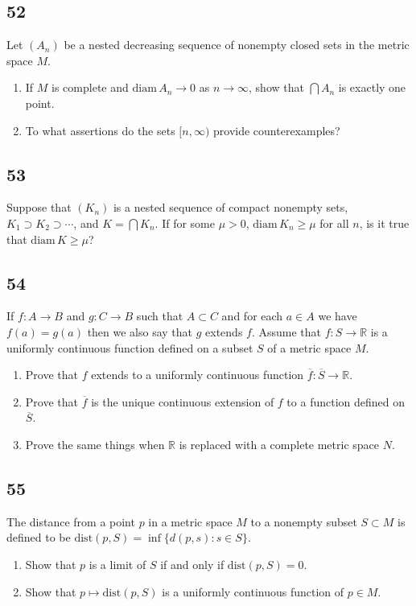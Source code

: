 \documentclass{amsart}
\begin{document}
\subsection*{52}
Let $(A_n)$ be a nested decreasing sequence of nonempty closed sets in the metric space $M$.
\begin{enumerate}[label=(\alph*)]
\item If $M$ is complete and $\mathrm{diam}\, A_n \to 0$ as $n \to \infty$, show that $\bigcap A_n$ is exactly one point.
\item To what assertions do the sets $[n,\infty)$ provide counterexamples?
\end{enumerate}

\subsection*{53}
Suppose that $(K_n)$ is a nested sequence of compact nonempty sets, $K_1 \supset K_2 \supset \cdots$, and $K = \bigcap K_n$. If for some $\mu > 0$, $\mathrm{diam}\, K_n \ge \mu$ for all $n$, is it true that $\mathrm{diam}\, K \ge \mu$?

\subsection*{54}
If $f : A \to B$ and $g : C \to B$ such that $A \subset C$ and for each $a \in A$ we have $f(a) = g(a)$ then we also say that $g$ extends $f$. Assume that $f : S \to \mathbb{R}$ is a uniformly continuous function defined on a subset $S$ of a metric space $M$.
\begin{enumerate}[label=(\alph*)]
\item Prove that $f$ extends to a uniformly continuous function $\overline{f} : \overline{S} \to \mathbb{R}$.
\item Prove that $\overline{f}$ is the unique continuous extension of $f$ to a function defined on $\overline{S}$.
\item Prove the same things when $\mathbb{R}$ is replaced with a complete metric space $N$.
\end{enumerate}

\subsection*{55}
The distance from a point $p$ in a metric space $M$ to a nonempty subset $S \subset M$ is defined to be $\mathrm{dist}(p,S) = \inf\{d(p,s) : s \in S\}$.
\begin{enumerate}[label=(\alph*)]
\item Show that $p$ is a limit of $S$ if and only if $\mathrm{dist}(p,S) = 0$.
\item Show that $p \mapsto \mathrm{dist}(p,S)$ is a uniformly continuous function of $p \in M$.
\end{enumerate}
\end{document}

